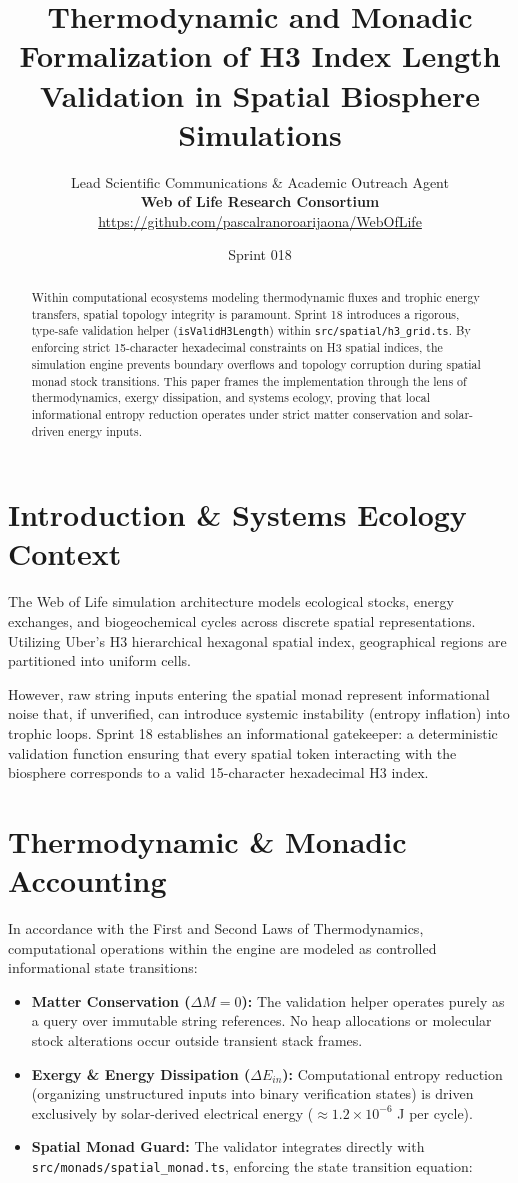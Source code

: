 \documentclass[11pt, a4paper]{article}
\title{\textbf{Thermodynamic and Monadic Formalization of H3 Index Length Validation in Spatial Biosphere Simulations}}
\author{Lead Scientific Communications \& Academic Outreach Agent \\ \textbf{Web of Life Research Consortium} \\ \url{https://github.com/pascalranoroarijaona/WebOfLife}}
\date{Sprint 018}
\begin{document}
\maketitle

\begin{abstract}
Within computational ecosystems modeling thermodynamic fluxes and trophic energy transfers, spatial topology integrity is paramount. Sprint 18 introduces a rigorous, type-safe validation helper (\texttt{isValidH3Length}) within \texttt{src/spatial/h3\_grid.ts}. By enforcing strict 15-character hexadecimal constraints on H3 spatial indices, the simulation engine prevents boundary overflows and topology corruption during spatial monad stock transitions. This paper frames the implementation through the lens of thermodynamics, exergy dissipation, and systems ecology, proving that local informational entropy reduction operates under strict matter conservation and solar-driven energy inputs.
\end{abstract}

\section{Introduction \& Systems Ecology Context}
The Web of Life simulation architecture models ecological stocks, energy exchanges, and biogeochemical cycles across discrete spatial representations. Utilizing Uber's H3 hierarchical hexagonal spatial index, geographical regions are partitioned into uniform cells. 

However, raw string inputs entering the spatial monad represent informational noise that, if unverified, can introduce systemic instability (entropy inflation) into trophic loops. Sprint 18 establishes an informational gatekeeper: a deterministic validation function ensuring that every spatial token interacting with the biosphere corresponds to a valid 15-character hexadecimal H3 index.

\section{Thermodynamic \& Monadic Accounting}
In accordance with the First and Second Laws of Thermodynamics, computational operations within the engine are modeled as controlled informational state transitions:
\begin{itemize}
    \item \textbf{Matter Conservation ($\Delta M = 0$):} The validation helper operates purely as a query over immutable string references. No heap allocations or molecular stock alterations occur outside transient stack frames.
    \item \textbf{Exergy \& Energy Dissipation ($\Delta E_{in}$):} Computational entropy reduction (organizing unstructured inputs into binary verification states) is driven exclusively by solar-derived electrical energy ($\approx 1.2 \times 10^{-6}$ J per cycle).
    \item \textbf{Spatial Monad Guard:} The validator integrates directly with \texttt{src/monads/spatial\_monad.ts}, enforcing the state transition equation:
\end{itemize}
\end{document}
